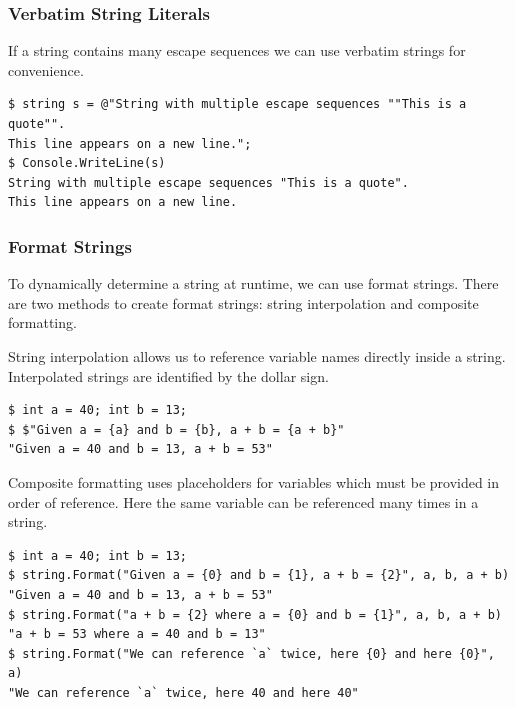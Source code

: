 \documentclass{article}
\begin{document}
\subsubsection{Verbatim String Literals}
If a string contains many escape sequences we can use verbatim strings for convenience.
\begin{lstlisting}
$ string s = @"String with multiple escape sequences ""This is a quote"".
This line appears on a new line.";
$ Console.WriteLine(s)
String with multiple escape sequences "This is a quote".
This line appears on a new line.
\end{lstlisting}
\subsubsection{Format Strings}
To dynamically determine a string at runtime, we can use format strings.
There are two methods to create format strings: string interpolation and composite formatting.

String interpolation allows us to reference variable names directly inside a string.
Interpolated strings are identified by the dollar sign.
\begin{lstlisting}
$ int a = 40; int b = 13;
$ $"Given a = {a} and b = {b}, a + b = {a + b}"
"Given a = 40 and b = 13, a + b = 53"
\end{lstlisting}
Composite formatting uses placeholders for variables which must be provided in order of reference.
Here the same variable can be referenced many times in a string.
\begin{lstlisting}
$ int a = 40; int b = 13;
$ string.Format("Given a = {0} and b = {1}, a + b = {2}", a, b, a + b)
"Given a = 40 and b = 13, a + b = 53"
$ string.Format("a + b = {2} where a = {0} and b = {1}", a, b, a + b)
"a + b = 53 where a = 40 and b = 13"
$ string.Format("We can reference `a` twice, here {0} and here {0}", a)
"We can reference `a` twice, here 40 and here 40"
\end{lstlisting}
\end{document}
